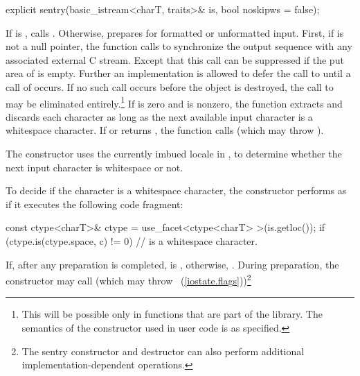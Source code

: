 %
\begin{itemdecl}
explicit sentry(basic_istream<charT, traits>& is, bool noskipws = false);
\end{itemdecl}

\begin{itemdescr}
\pnum
\effects
If
is
,
calls . Otherwise,
prepares for formatted or
unformatted input.
First, if
is not a null pointer, the
function calls
%
to synchronize the output sequence with any associated external
C stream.
Except that this call can be suppressed if the put area of
is empty.
Further an implementation is allowed to defer the call to
until a
call of
occurs.
If no such call occurs before the
object is destroyed, the call to
may be eliminated entirely.\footnote{This will be possible only in functions
that are part of the library.
The semantics of the constructor used in user code is as specified.}
If  is zero and
is nonzero, the function extracts and discards each character as long as
the next available input character  is a whitespace character.
If
or
returns
,
the function calls
(which may throw
).

\pnum
\remarks
The constructor
uses the currently imbued locale in ,
to determine whether the next input character is
whitespace or not.

\pnum
To decide if the character  is a whitespace character,
the constructor performs as if it executes the following code fragment:
\begin{codeblock}
const ctype<charT>& ctype = use_facet<ctype<charT> >(is.getloc());
if (ctype.is(ctype.space, c) != 0)
  //  is a whitespace character.
\end{codeblock}

\pnum
If, after any preparation is completed,
is
,
otherwise,
.
During preparation, the constructor may call
(which may throw
~(\ref{iostate.flags}))\footnote{The sentry
constructor and destructor
can also perform additional
%
implementation-dependent operations.}
\end{itemdescr}

